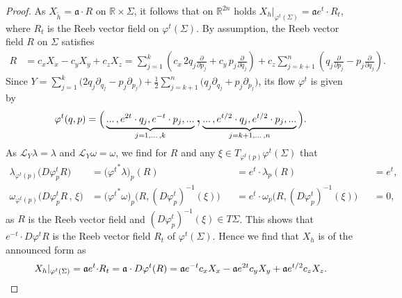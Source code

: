 \documentclass[a4paper,12pt,bibliography=totocnumbered,titlepage=false,abstracton,bookmarksnumbered=true]{scrartcl}
\theoremstyle{definition}
\begin{document}
\begin{proof}
 As $X_{\tilde{h}}=\mathfrak{a}{\cdot} R$ on $\mathbb{R}{\times}\Sigma$, it follows that on $\mathbb{R}^{2n}$ holds $X_h|_{\varphi^t(\Sigma)}=\mathfrak{a} e^t{\cdot} R_t$, where $R_t$ is the Reeb vector field on $\varphi^t(\Sigma)$. By assumption, the Reeb vector field $R$ on $\Sigma$ satisfies
 \begin{align*}
  R &= c_x X_x-c_y X_y+c_z X_z = \sum_{j=1}^k\left( c_x\,2q_j\frac{\partial}{\partial p_j}+c_y\,p_j\frac{\partial}{\partial q_j}\right) + c_z\sum_{j=k+1}^n \left(q_j\frac{\partial}{\partial p_j}-p_j\frac{\partial}{\partial q_j}\right).
 \end{align*}
 Since $Y=\sum_{j=1}^k\big(2q_j\partial_{q_j}-p_j\partial_{p_j}\big)+\frac{1}{2}\sum_{j=k+1}^n\big(q_j\partial_{q_j}+p_j\partial_{p_j}\big)$, its flow $\varphi^t$ is given by
 \[\varphi^t(q,p)=\Big(\underbrace{...\,,e^{2t}\cdot q_j,e^{-t}\cdot p_j,...}_{j=1,...\,,k}\text{\huge,}\underbrace{...\,,e^{t/2}\cdot q_j,e^{t/2}\cdot p_j,...}_{j=k+1,...\,,n}\Big).\]
 As $\mathcal{L}_Y\lambda=\lambda$ and $\mathcal{L}_Y\omega=\omega$, we find for $R$ and any $\xi\in T_{\varphi^t(p)}\varphi^t(\Sigma)$ that
 \begin{align*}
  \lambda_{\varphi^t(p)}\big(D\varphi^t_p R\big) &=\big({\varphi^t}^\ast \lambda\big)_p(R)&&=e^t\cdot \lambda_p(R)&&=e^t,\\
  \omega_{\varphi^t(p)}\big(D\varphi^t_p R\,,\,\xi\big) &=\big({\varphi^t}^\ast\omega\big)_p\big(R,(D\varphi^t_p)^{-1}(\xi)\big)&&=e^t\cdot\omega_p\big(R,(D\varphi^t_p)^{-1}(\xi)\big)&&=0,
 \end{align*}
as $R$ is the Reeb vector field and $(D\varphi^t_p)^{-1}(\xi)\in T\Sigma$. This shows that $e^{-t}\cdot D\varphi^t R$ is the Reeb vector field $R_t$ of $\varphi^t(\Sigma)$. Hence we find that $X_h$ is of the announced form as
\[X_h|_{\varphi^t(\Sigma)}=\mathfrak{a} e^t{\cdot} R_t = \mathfrak{a}\cdot D\varphi^t(R) = \mathfrak{a} e^{-t}c_xX_x - \mathfrak{a} e^{2t}c_yX_y+\mathfrak{a} e^{t/2}c_zX_z.\qedhere\]
\end{proof}
\end{document}
